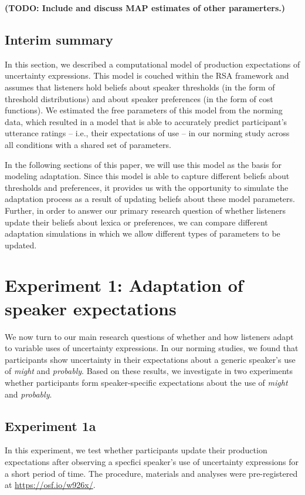 \documentclass[lucida,biblatex]{sp} %
\newcommand{\todo}[1]{}
\renewcommand{\todo}[1]{{\bf \color{red} (TODO: {#1})}}
\begin{document}
 \todo{Include and discuss MAP estimates of other paramerters.}
 
 \subsection{Interim summary}
 
 In this section, we described a computational model of production expectations of uncertainty expressions. This model
 is couched within the RSA framework and assumes that listeners hold beliefs about speaker thresholds (in the form
 of threshold distributions) and about speaker preferences (in the form of cost functions). We estimated 
 the free parameters of this model from the norming data, which resulted in a model that is able to accurately predict
 participant's utterance ratings -- i.e., their expectations of use --  in our norming study across all conditions with a shared set of parameters.
 
 In the following sections of this paper, we will use this model as the basis for modeling adaptation. Since this model
 is able to capture different beliefs about thresholds and preferences, it provides us with the opportunity to simulate 
 the adaptation process as a result of updating beliefs about these model parameters. Further, in order to answer
 our primary research question of whether listeners update their beliefs about lexica or preferences, we can compare
 different adaptation simulations in which we allow different types of parameters to be updated.





\section{Experiment 1: Adaptation of speaker expectations}
\label{sec:exp-prod-adaptation}



We now turn to our main research questions of whether and how listeners adapt to variable uses of uncertainty expressions.
In our norming studies, we found that participants show uncertainty in their expectations about a generic speaker's 
use of \textit{might} and \textit{probably}. Based on these results, we investigate in two experiments whether participants
form speaker-specific expectations about the use of \textit{might} and \textit{probably}.

\subsection{Experiment 1a}
In this experiment, we test whether participants update their production expectations after observing a specfici speaker's use of 
uncertainty expressions for a short period of time. The procedure, materials and analyses were pre-registered at \url{https://osf.io/w926x/}.
\end{document}
